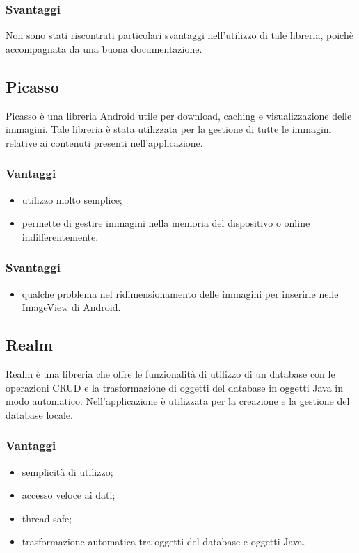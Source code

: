 \documentclass[../Tesi.tex]{subfiles}
\begin{document}
		\subsubsection{Svantaggi}
			Non sono stati riscontrati particolari svantaggi nell'utilizzo di tale libreria, poichè accompagnata da una buona documentazione.

	\subsection{Picasso}
		Picasso è una libreria Android utile per download, caching e visualizzazione delle immagini. Tale libreria è stata utilizzata per la gestione di tutte le immagini relative ai contenuti presenti nell'applicazione.
		\subsubsection{Vantaggi}
			\begin{itemize}
				\item utilizzo molto semplice;
				\item permette di gestire immagini nella memoria del dispositivo o online indifferentemente.
			\end{itemize}
		\subsubsection{Svantaggi}
			\begin{itemize}
				\item qualche problema nel ridimensionamento delle immagini per inserirle nelle ImageView di Android.
			\end{itemize}


	\subsection{Realm}
		Realm è una libreria che offre le funzionalità di utilizzo di un database con le operazioni CRUD e la trasformazione di oggetti del database in oggetti Java in modo automatico. Nell'applicazione è utilizzata per la creazione e la gestione del database locale.
		\subsubsection{Vantaggi}
			\begin{itemize}
				\item semplicità di utilizzo;
				\item accesso veloce ai dati;
				\item thread-safe;
				\item trasformazione automatica tra oggetti del database e oggetti Java.
			\end{itemize}
\end{document}
